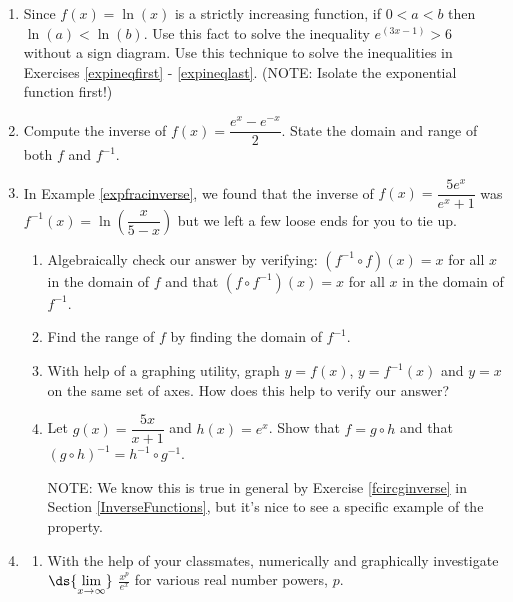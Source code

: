 \documentclass{ximera}
\begin{document}
\begin{enumerate}
\setcounter{enumi}{\value{HW}}

\item \label{onetoonelogexercise} Since $f(x) = \ln(x)$ is a strictly increasing function, if $0 < a < b$ then $\ln(a) < \ln(b)$.  Use this fact to solve the inequality $e^{(3x - 1)} > 6$ without a sign diagram. Use this technique to solve the inequalities in Exercises \ref{expineqfirst} - \ref{expineqlast}. (NOTE:  Isolate the exponential function first!)

\item \label{hyperbolicsine} Compute the inverse of $f(x) = \dfrac{e^{x} - e^{-x}}{2}$.  State the domain and range of both $f$ and $f^{-1}$. 

\item \label{checkingexpfracinverse} In Example \ref{expfracinverse}, we found that the inverse of $f(x) = \dfrac{5e^{x}}{e^{x}+1}$ was $f^{-1}(x) = \ln\left(\dfrac{x}{5-x}\right)$ but we left a few loose ends for you to tie up.  

\begin{enumerate}

\item Algebraically check our answer by verifying: $\left(f^{-1} \circ f\right)(x) = x$ for all $x$ in the domain of $f$ and that $\left(f \circ f^{-1}\right)(x) = x$ for all $x$ in the domain of $f^{-1}$.

\item Find the range of $f$ by finding the domain of $f^{-1}$.

\item With help of a graphing utility, graph $y = f(x)$,  $y = f^{-1}(x)$ and $y = x$ on the same set of axes.  How does this help to verify our answer?

\item Let $g(x) = \dfrac{5x}{x+1}$ and $h(x) = e^{x}$.  Show that $f = g \circ h$ and that $(g \circ h)^{-1} = h^{-1} \circ g^{-1}$. 

NOTE:  We know this is true in general by Exercise \ref{fcircginverse} in Section \ref{InverseFunctions}, but it's nice to see a specific example of the property.

\end{enumerate}

\item \label{powerexponentialgrowthex} \begin{enumerate} \item\label{numericalinvestigationlimitxpoverex} With the help of your classmates, numerically and graphically investigate $\ds{\lim_{x \rightarrow \infty}}$ $\frac{x^{p}}{e^{x}}$ for various real number powers, $p$.


\end{enumerate}
\end{enumerate}
\end{document}
